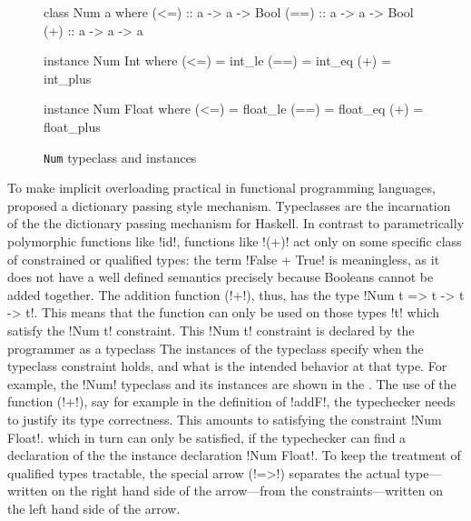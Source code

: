 \documentclass[screen,nonacm,manuscript,review]{acmart} %
\begin{document}
\begin{figure}[ht]
\centering
\begin{minipage}[ht]{0.3\linewidth}
\begin{CenteredBox}
\begin{code}
class Num a where
  (<=) :: a -> a -> Bool
  (==) :: a -> a -> Bool
  (+) :: a -> a -> a
\end{code}
\end{CenteredBox}
\end{minipage}%
\begin{minipage}[ht]{0.3\linewidth}
\begin{CenteredBox}
\begin{code}
instance Num Int where
  (<=) = int_le
  (==) = int_eq
  (+) = int_plus
\end{code}
\end{CenteredBox}
\end{minipage}%
\begin{minipage}[ht]{0.3\linewidth}
\begin{CenteredBox}
\begin{code}
instance Num Float where
  (<=) = float_le
  (==) = float_eq
  (+) = float_plus
\end{code}
\end{CenteredBox}
\end{minipage}
\caption{\lstinline{Num} typeclass and instances}
\label{fig:tc-num}
\end{figure}

To make implicit overloading practical in functional programming languages,
\citet{wadler_polymorphism_1989} proposed a dictionary passing style
mechanism. Typeclasses are the incarnation of the the dictionary passing mechanism for
Haskell. In contrast to parametrically polymorphic functions like
!id!, functions like !(+)! act only on some specific class of constrained or qualified
types\cite{jones_qualified_1994}: the term !False + True! is meaningless, as it does not have a well
defined semantics precisely because Booleans cannot be added
together. The addition function (!+!), thus, has the type
!Num t => t -> t -> t!. This means that the function can only be used
on those types !t! which satisfy the !Num t! constraint. This !Num t!
constraint is declared by the programmer as a typeclass The instances
of the typeclass specify when the typeclass
constraint holds, and what is the intended behavior at that type. For
example, the !Num! typeclass and its instances are shown in the
. The use of the function (!+!), say for
example in the definition of !addF!, the typechecker needs to justify
its type correctness. This amounts to satisfying the constraint !Num Float!.
which in turn can only be satisfied, if the typechecker can find a declaration of the
the instance declaration !Num Float!. To keep the treatment of qualified types
tractable, the special arrow (!=>!) separates the actual type---written on
the right hand side of the arrow---from the constraints---written on the left hand side of the arrow.
\end{document}
